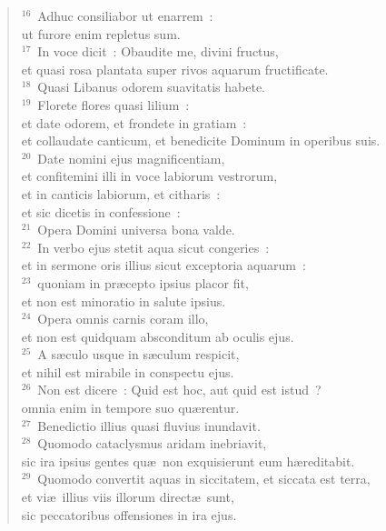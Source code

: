 \begin{verse}${}^{16}$~Adhuc consiliabor ut enarrem~:\\ ut furore enim repletus sum.\\
${}^{17}$~In voce dicit~: Obaudite me, divini fructus,\\ et quasi rosa plantata super rivos aquarum fructificate.\\
${}^{18}$~Quasi Libanus odorem suavitatis habete.\\
${}^{19}$~Florete flores quasi lilium~:\\ et date odorem, et frondete in gratiam~:\\ et collaudate canticum, et benedicite Dominum in operibus suis.\\
${}^{20}$~Date nomini ejus magnificentiam,\\ et confitemini illi in voce labiorum vestrorum,\\ et in canticis labiorum, et citharis~:\\ et sic dicetis in confessione~:\\
${}^{21}$~Opera Domini universa bona valde.\\
${}^{22}$~In verbo ejus stetit aqua sicut congeries~:\\ et in sermone oris illius sicut exceptoria aquarum~:\\
${}^{23}$~quoniam in pr\ae cepto ipsius placor fit,\\ et non est minoratio in salute ipsius.\\
${}^{24}$~Opera omnis carnis coram illo,\\ et non est quidquam absconditum ab oculis ejus.\\
${}^{25}$~A s\ae culo usque in s\ae culum respicit,\\ et nihil est mirabile in conspectu ejus.\\
${}^{26}$~Non est dicere~: Quid est hoc, aut quid est istud~?\\ omnia enim in tempore suo qu\ae rentur.\\
${}^{27}$~Benedictio illius quasi fluvius inundavit.\\
${}^{28}$~Quomodo cataclysmus aridam inebriavit,\\ sic ira ipsius gentes qu\ae\ non exquisierunt eum h\ae reditabit.\\
${}^{29}$~Quomodo convertit aquas in siccitatem, et siccata est terra,\\ et vi\ae\ illius viis illorum direct\ae\ sunt,\\ sic peccatoribus offensiones in ira ejus.\\

\end{verse}
